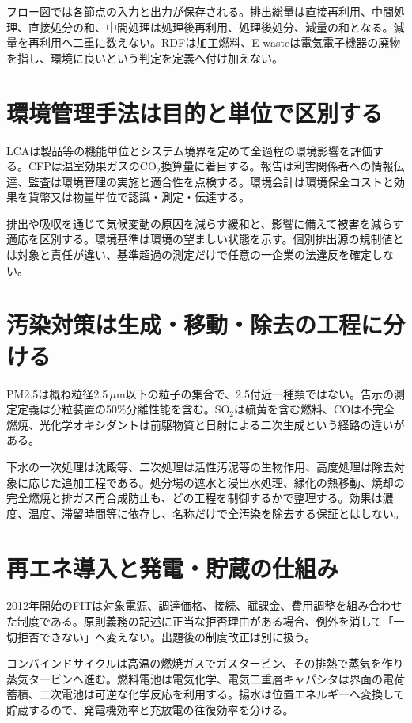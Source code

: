 フロー図では各節点の入力と出力が保存される。排出総量は直接再利用、中間処理、直接処分の和、中間処理は処理後再利用、処理後処分、減量の和となる。減量を再利用へ二重に数えない。RDFは加工燃料、E-wasteは電気電子機器の廃物を指し、環境に良いという判定を定義へ付け加えない。

\section{環境管理手法は目的と単位で区別する}
\label{theory:env:lca}
\label{theory:env:accounting}
LCAは製品等の機能単位とシステム境界を定めて全過程の環境影響を評価する。CFPは温室効果ガスのCO\(_2\)換算量に着目する。報告は利害関係者への情報伝達、監査は環境管理の実施と適合性を点検する。環境会計は環境保全コストと効果を貨幣又は物量単位で認識・測定・伝達する。\cite{env58_accounting}

排出や吸収を通じて気候変動の原因を減らす緩和と、影響に備えて被害を減らす適応を区別する。環境基準は環境の望ましい状態を示す。個別排出源の規制値とは対象と責任が違い、基準超過の測定だけで任意の一企業の法違反を確定しない。\cite{env58_pmstandard}

\section{汚染対策は生成・移動・除去の工程に分ける}
\label{theory:env:treatment}
\label{theory:env:air}
PM2.5は概ね粒径2.5\(\,\mu\)m以下の粒子の集合で、2.5付近一種類ではない。告示の測定定義は分粒装置の50\%分離性能を含む。SO\(_2\)は硫黄を含む燃料、COは不完全燃焼、光化学オキシダントは前駆物質と日射による二次生成という経路の違いがある。\cite{env58_pmstandard,env58_pm25}

下水の一次処理は沈殿等、二次処理は活性汚泥等の生物作用、高度処理は除去対象に応じた追加工程である。処分場の遮水と浸出水処理、緑化の熱移動、焼却の完全燃焼と排ガス再合成防止も、どの工程を制御するかで整理する。効果は濃度、温度、滞留時間等に依存し、名称だけで全汚染を除去する保証とはしない。

\section{再エネ導入と発電・貯蔵の仕組み}
\label{theory:env:fit}
\label{theory:env:generation}
2012年開始のFITは対象電源、調達価格、接続、賦課金、費用調整を組み合わせた制度である。原則義務の記述に正当な拒否理由がある場合、例外を消して「一切拒否できない」へ変えない。出題後の制度改正は別に扱う。\cite{env58_fit2013}

コンバインドサイクルは高温の燃焼ガスでガスタービン、その排熱で蒸気を作り蒸気タービンへ進む。燃料電池は電気化学、電気二重層キャパシタは界面の電荷蓄積、二次電池は可逆な化学反応を利用する。揚水は位置エネルギーへ変換して貯蔵するので、発電機効率と充放電の往復効率を分ける。

